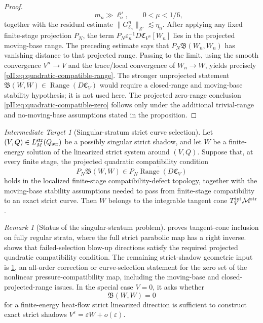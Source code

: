 \documentclass[11pt]{article}
\numberwithin{equation}{section}
\theoremstyle{plain}
\theoremstyle{definition}
\theoremstyle{remark}
\newtheorem{target}{Intermediate Target}[section]
\newtheorem{remark}{Remark}[section]
\newcommand{\str}{\mathrm{str}}
\begin{document}
\begin{proof}
\[        \qquad
        m_n\gg \ell_n^\mu,
        \qquad
        0<\mu<1/6,
\]
together with the residual estimate $\|G^n_{\delta_n}\|_{Z'}\lesssim\eta_n$.
After applying any fixed finite-stage projection \(P_N\), the term \(P_N\varepsilon_n^{-1}D\mathfrak C_{V^n}[W_n]\) lies in the projected moving-base range.  The preceding estimate says that \(P_N\mathfrak B(W_n,W_n)\) has vanishing distance to that projected range.  Passing to the limit, using the smooth convergence $V^n\to V$ and the trace/local convergence of $W_n\to W$, yields precisely \eqref{pII:eq:quadratic-compatible-range}.  The stronger unprojected statement \(\mathfrak B(W,W)\in\operatorname{Range}(D\mathfrak C_V)\) would require a closed-range and moving-base stability hypothesis; it is not used here.  The projected zero-range conclusion \eqref{pII:eq:quadratic-compatible-zero} follows only under the additional trivial-range and no-moving-base assumptions stated in the proposition.
\end{proof}


\begin{target}[Singular-stratum strict curve selection]\label{pII:ass:singular-curve-selection}
Let $(V,Q)\in L_M^{\str}(Q_{\rm str})$ be a possibly singular strict shadow, and let $W$ be a finite-energy solution of the linearized strict system around $(V,Q)$.  Suppose that, at every finite stage, the projected quadratic compatibility condition
\begin{equation}\label{pII:eq:singular-curve-selection-condition}
        P_N\mathfrak B(W,W)
        \in \overline{P_N\operatorname{Range}(D\mathfrak C_V)}
\end{equation}
holds in the localized finite-stage compatibility-defect topology, together with the moving-base stability assumptions needed to pass from finite-stage compatibility to an exact strict curve.  Then $W$ belongs to the integrable tangent cone $T_V^{\rm int}\mathcal M^{\str}$.
\end{target}

\begin{remark}[Status of the singular-stratum problem]\label{pII:rem:singular-curve-selection-status}
 proves tangent-cone inclusion on fully regular strata, where the full strict parabolic map has a right inverse.   shows that failed-selection blow-up directions satisfy the required projected quadratic compatibility condition.  The remaining strict-shadow geometric input is \cref{pII:ass:singular-curve-selection}, an all-order correction or curve-selection statement for the zero set of the nonlinear pressure-compatibility map, including the moving-base and closed-projected-range issues.  In the special case $V=0$, it asks whether
\[
        \mathfrak B(W,W)=0
\]
for a finite-energy heat-flow strict linearized direction is sufficient to construct exact strict shadows $V^\varepsilon=\varepsilon W+o(\varepsilon)$.
\end{remark}
\end{document}
